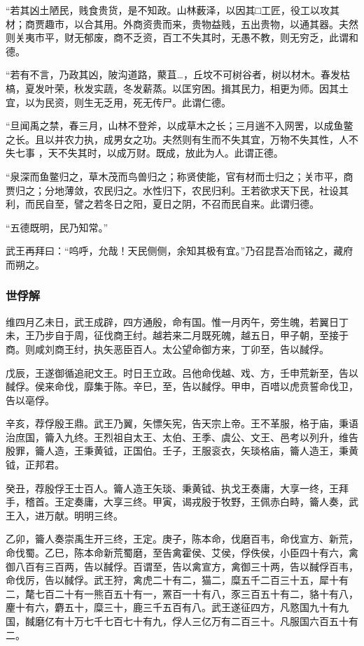 \documentclass[]{article}
\begin{document}
``若其凶土陋民，贱食贵货，是不知政。山林薮泽，以因其□工匠，役工以攻其材；商贾趣市，以合其用。外商资贵而来，贵物益贱，五出贵物，以通其器。夫然则关夷市平，财无郁废，商不乏资，百工不失其时，无愚不教，则无穷乏，此谓和德。

``若有不言，乃政其凶，陂沟道路，藂苴\ldots{}，丘坟不可树谷者，树以材木。春发枯槁，夏发叶荣，秋发实蔬，冬发薪蒸。以匡穷困。揖其民力，相更为师。因其土宜，以为民资，则生无乏用，死无传尸。此谓仁德。

``旦闻禹之禁，春三月，山林不登斧，以成草木之长；三月遄不入网罟，以成鱼鳖之长。且以并农力执，成男女之功。夫然则有生而不失其宜，万物不失其性，人不失七事
，天不失其时，以成万财。既成，放此为人。此谓正德。

``泉深而鱼鳖归之，草木茂而鸟兽归之；称贤使能，官有材而士归之；关市平，商贾归之；分地薄敛，农民归之。水性归下，农民归利。王若欲求天下民，社设其利，而民自至，譬之若冬日之阳，夏日之阴，不召而民自来。此谓归德。

``五德既明，民乃知常。''

武王再拜曰：``呜呼，允哉！天民侧侧，余知其极有宜。''乃召昆吾冶而铭之，藏府而朔之。

\hypertarget{header-n215}{%
\subsubsection{世俘解}\label{header-n215}}

维四月乙未日，武王成辟，四方通殷，命有国。惟一月丙午，旁生魄，若翼日丁未，王乃步自于周，征伐商王纣。越若来二月既死魄，越五日，甲子朝，至接于商。则咸刘商王纣，执矢恶臣百人。太公望命御方来，丁卯至，告以馘俘。

戊辰，王遂御循追祀文王。时日王立政。吕他命伐越、戏、方，壬申荒新至，告以馘俘。侯来命伐，靡集于陈。辛巳，至，告以馘俘。甲申，百唶以虎贲誓命伐卫，告以亳俘。

辛亥，荐俘殷王鼎。武王乃翼，矢慓矢宪，告天宗上帝。王不革服，格于庙，秉语治庶国，籥入九终。王烈祖自太王、太伯、王季、虞公、文王、邑考以列升，维告殷罪，籥人造，王秉黄钺，正国伯。壬子，王服衮衣，矢琰格庙，籥人造王，秉黄钺，正邦君。

癸丑，荐殷俘王士百人。籥人造王矢琰、秉黄钺、执戈王奏庸，大享一终，王拜手，稽首。王定奏庸，大享三终。甲寅，谒戎殷于牧野，王佩赤白畤，籥人奏，武王入，进万献。明明三终。

乙卯，籥人奏崇禹生开三终，王定。庚子，陈本命，伐磨百韦，命伐宣方、新荒，命伐蜀。乙巳，陈本命新荒蜀磨，至告禽霍侯、艾侯，俘佚侯，小臣四十有六，禽御八百有三百两，告以馘俘。百谓至，告以禽宣方，禽御三十两，告以馘俘百韦，命伐厉，告以馘俘。武王狩，禽虎二十有二，猫二，糜五千二百三十五，犀十有二，氂七百二十有一熊百五十有一，罴百一十有八，豕三百五十有二，貉十有八，麈十有六，麝五十，糜三十，鹿三千五百有八。武王遂征四方，凡憝国九十有九国，馘磨亿有十万七千七百七十有九，俘人三亿万有二百三十。凡服国六百五十有二。
\end{document}
